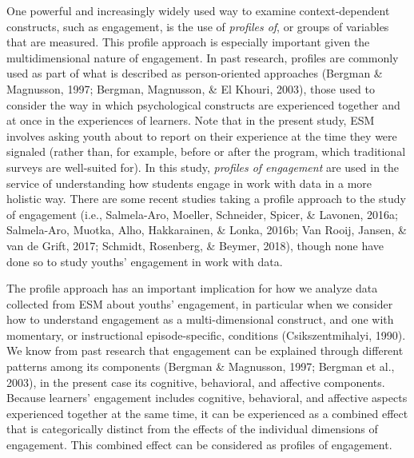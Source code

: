 \documentclass[]{book}
\theoremstyle{definition}
\theoremstyle{definition}
\theoremstyle{definition}
\theoremstyle{remark}
\begin{document}
One powerful and increasingly widely used way to examine
context-dependent constructs, such as engagement, is the use of
\emph{profiles of}, or groups of variables that are measured. This
profile approach is especially important given the multidimensional
nature of engagement. In past research, profiles are commonly used as
part of what is described as person-oriented approaches (Bergman \&
Magnusson, 1997; Bergman, Magnusson, \& El Khouri, 2003), those used to
consider the way in which psychological constructs are experienced
together and at once in the experiences of learners. Note that in the
present study, ESM involves asking youth about to report on their
experience at the time they were signaled (rather than, for example,
before or after the program, which traditional surveys are well-suited
for). In this study, \emph{profiles of engagement} are used in the
service of understanding how students engage in work with data in a more
holistic way. There are some recent studies taking a profile approach to
the study of engagement (i.e., Salmela-Aro, Moeller, Schneider, Spicer,
\& Lavonen, 2016a; Salmela-Aro, Muotka, Alho, Hakkarainen, \& Lonka,
2016b; Van Rooij, Jansen, \& van de Grift, 2017; Schmidt, Rosenberg, \&
Beymer, 2018), though none have done so to study youths' engagement in
work with data.

The profile approach has an important implication for how we analyze
data collected from ESM about youths' engagement, in particular when we
consider how to understand engagement as a multi-dimensional construct,
and one with momentary, or instructional episode-specific, conditions
(Csikszentmihalyi, 1990). We know from past research that engagement can
be explained through different patterns among its components (Bergman \&
Magnusson, 1997; Bergman et al., 2003), in the present case its
cognitive, behavioral, and affective components. Because learners'
engagement includes cognitive, behavioral, and affective aspects
experienced together at the same time, it can be experienced as a
combined effect that is categorically distinct from the effects of the
individual dimensions of engagement. This combined effect can be
considered as profiles of engagement.
\end{document}
